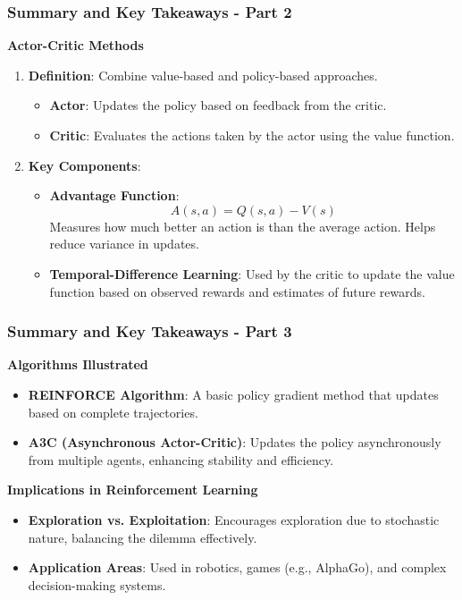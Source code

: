 \documentclass[aspectratio=169]{beamer}
\begin{document}
\begin{frame}[fragile]
    \frametitle{Summary and Key Takeaways - Part 2}
    \textbf{Actor-Critic Methods}
    \begin{enumerate}[resume]
        \item \textbf{Definition}: Combine value-based and policy-based approaches.
            \begin{itemize}
                \item \textbf{Actor}: Updates the policy based on feedback from the critic.
                \item \textbf{Critic}: Evaluates the actions taken by the actor using the value function.
            \end{itemize}
        
        \item \textbf{Key Components}:
            \begin{itemize}
                \item \textbf{Advantage Function}: 
                    \[
                    A(s, a) = Q(s, a) - V(s)
                    \]
                    Measures how much better an action is than the average action. Helps reduce variance in updates.
                
                \item \textbf{Temporal-Difference Learning}: Used by the critic to update the value function based on observed rewards and estimates of future rewards.
            \end{itemize}
    \end{enumerate}
\end{frame}

\begin{frame}[fragile]
    \frametitle{Summary and Key Takeaways - Part 3}
    \textbf{Algorithms Illustrated}
    \begin{itemize}
        \item \textbf{REINFORCE Algorithm}: A basic policy gradient method that updates based on complete trajectories.
        \item \textbf{A3C (Asynchronous Actor-Critic)}: Updates the policy asynchronously from multiple agents, enhancing stability and efficiency.
    \end{itemize}

    \textbf{Implications in Reinforcement Learning}
    \begin{itemize}
        \item \textbf{Exploration vs. Exploitation}: Encourages exploration due to stochastic nature, balancing the dilemma effectively.
        \item \textbf{Application Areas}: Used in robotics, games (e.g., AlphaGo), and complex decision-making systems.
    \end{itemize}
\end{frame}
\end{document}
